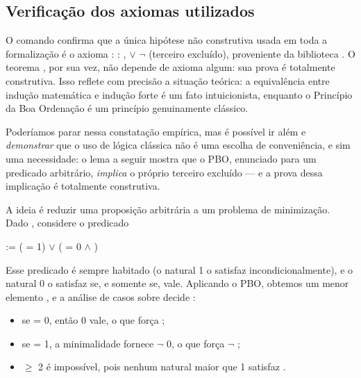 \subsection{Verificação dos axiomas utilizados}




    O comando    confirma que a única
    hipótese não construtiva usada em toda a formalização é o axioma
     : \coqdockw{\ensuremath{\forall}}  : ,  \ensuremath{\lor} \ensuremath{\lnot}  (terceiro excluído),
    proveniente da biblioteca . O teorema ,
    por sua vez, não depende de axioma algum: sua prova é totalmente
    construtiva. Isso reflete com precisão a situação teórica: a
    equivalência entre indução matemática e indução forte é um fato
    intuicionista, enquanto o Princípio da Boa Ordenação é um
    princípio genuinamente clássico.


    Poderíamos parar nessa constatação empírica, mas é possível ir
    além e \textit{demonstrar} que o uso de lógica clássica não é uma
    escolha de conveniência, e sim uma necessidade: o lema a seguir
    mostra que o PBO, enunciado para um predicado arbitrário,
    \textit{implica} o próprio terceiro excluído — e a prova dessa
    implicação é totalmente construtiva.


    A ideia é reduzir uma proposição arbitrária  a um problema de
    minimização. Dado , considere o predicado


      := ( = 1) \ensuremath{\lor} ( = 0 \ensuremath{\land} )


    Esse predicado é sempre habitado (o natural 1 o satisfaz
    incondicionalmente), e o natural 0 o satisfaz se, e somente
    se,  vale. Aplicando o PBO, obtemos um menor elemento , e
    a análise de casos sobre  decide :



\begin{itemize}
\item  se  = 0, então  0 vale, o que força ;



\item  se  = 1, a minimalidade fornece \ensuremath{\lnot}  0, o que força \ensuremath{\lnot} ;



\item  {} \ensuremath{\ge} 2 é impossível, pois nenhum natural maior que 1
      satisfaz .

\end{itemize}


